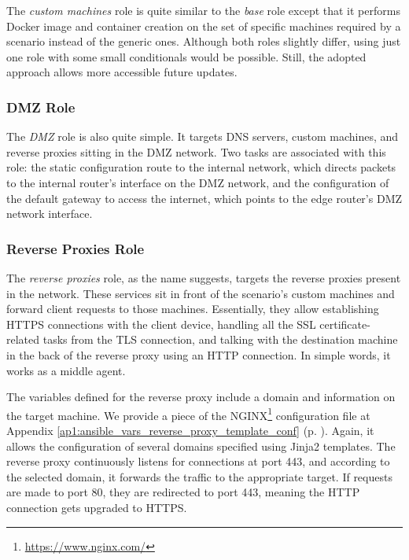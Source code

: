 The \textit{custom machines} role is quite similar to the \textit{base} role except that it performs Docker image and container creation on the set of specific machines required by a scenario instead of the generic ones. Although both roles slightly differ, using just one role with some small conditionals would be possible. Still, the adopted approach allows more accessible future updates.

\subsubsection{DMZ Role} \label{sec:ansible_dmz_role}

The \textit{DMZ} role is also quite simple. It targets DNS servers, custom machines, and reverse proxies sitting in the DMZ network. Two tasks are associated with this role: the static configuration route to the internal network, which directs packets to the internal router's interface on the DMZ network, and the configuration of the default gateway to access the internet, which points to the edge router's DMZ network interface.

\subsubsection{Reverse Proxies Role} \label{sec:ansible_reverse_proxies_role}

The \textit{reverse proxies} role, as the name suggests, targets the reverse proxies present in the network. These services sit in front of the scenario's custom machines and forward client requests to those machines. Essentially, they allow establishing HTTPS connections with the client device, handling all the SSL certificate-related tasks from the TLS connection, and talking with the destination machine in the back of the reverse proxy using an HTTP connection. In simple words, it works as a middle agent.

The variables defined for the reverse proxy include a domain and information on the target machine. We provide a piece of the NGINX\footnote{\url{https://www.nginx.com/}} configuration file at Appendix \ref{ap1:ansible_vars_reverse_proxy_template_conf} (p. \pageref{ap1:ansible_vars_reverse_proxy_template_conf}). Again, it allows the configuration of several domains specified using Jinja2 templates. The reverse proxy continuously listens for connections at port 443, and according to the selected domain, it forwards the traffic to the appropriate target. If requests are made to port 80, they are redirected to port 443, meaning the HTTP connection gets upgraded to HTTPS.

